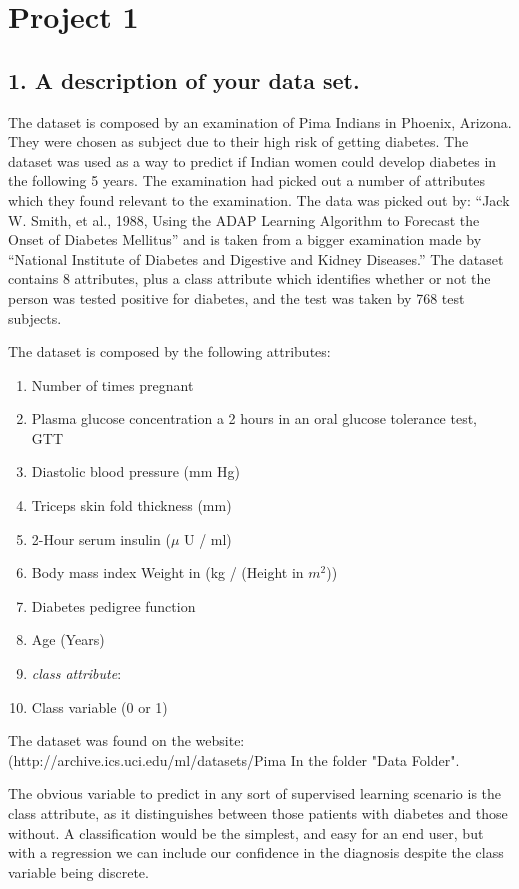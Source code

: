 \section{Project 1}

\subsection{1. A description of your data set.}

The dataset is composed by an examination of Pima Indians in Phoenix, Arizona.
They were chosen as subject due to their high risk of getting diabetes.
The dataset was used as a way to predict if Indian women could develop diabetes in the following 5 years.
The examination had picked out a number of attributes which they found relevant to the examination.
The data was picked out by: “Jack W. Smith, et al., 1988, Using the ADAP Learning Algorithm to Forecast the Onset of Diabetes Mellitus”
and is taken from a bigger examination made by “National Institute of Diabetes and Digestive and Kidney Diseases.”
The dataset contains 8 attributes, plus a class attribute which identifies whether or not the person was tested positive for diabetes,
 and the test was taken by 768 test subjects.

The dataset is composed by the following attributes:
\begin{enumerate}
\item Number of times pregnant
\item Plasma glucose concentration a 2 hours in an oral glucose tolerance test, GTT
\item Diastolic blood pressure (mm Hg)
\item Triceps skin fold thickness (mm)
\item 2-Hour serum insulin ($\mu$ U / ml)
\item Body mass index Weight in (kg / (Height in $m^2$))
\item Diabetes pedigree function
\item Age (Years)

\item \emph{class attribute}:
\item Class variable (0 or 1)
\end{enumerate}


The dataset was found on the website: (http://archive.ics.uci.edu/ml/datasets/Pima%
In the folder "Data Folder".

The obvious variable to predict
in any sort of supervised learning scenario
is the class attribute,
as it distinguishes between
those patients with diabetes and those without.
A classification would be the simplest,
and easy for an end user,
but with a regression
we can include our confidence in the diagnosis
despite the class variable being discrete.

